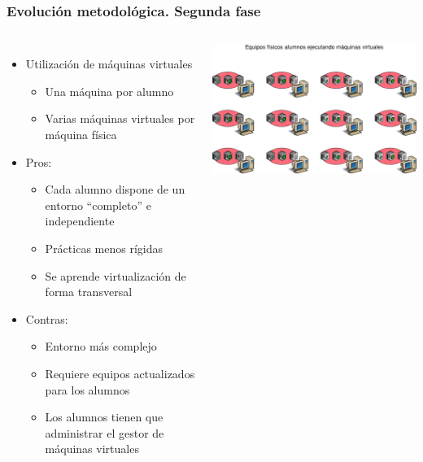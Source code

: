 \documentclass{beamer}
\begin{document}
\begin{frame}
  \frametitle{Evolución metodológica. Segunda fase}
  \begin{columns}
    \begin{itemize}
    \item Utilización de máquinas virtuales
      \begin{itemize}
      \item Una máquina por alumno
      \item Varias máquinas virtuales por máquina física
      \end{itemize}
      \item Pros:
      \begin{itemize}
      \item Cada alumno dispone de un entorno ``completo'' e independiente
      \item Prácticas menos rígidas
      \item Se aprende virtualización de forma transversal
      \end{itemize}
      \item Contras:
      \begin{itemize}
      \item Entorno más complejo
      \item Requiere equipos actualizados para los alumnos
      \item Los alumnos tienen que administrar el gestor de máquinas
        virtuales 
      \end{itemize}
    \end{itemize}
    \includegraphics[width=\columnwidth]{../img/epoca2.png}
  \end{columns}
\end{frame}
\end{document}
